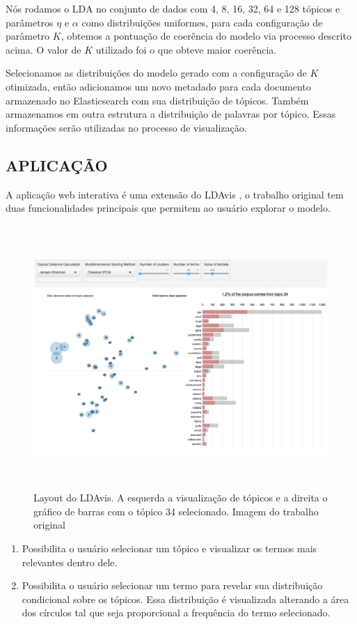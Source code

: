 \documentclass[12pt,a4paper]{article}
\begin{document}
  Nós rodamos o LDA no conjunto de dados com 4, 8, 16, 32, 64 e 128 tópicos e parâmetros $\eta$ e $\alpha$ como distribuições uniformes, para cada configuração de parâmetro $K$,
   obtemos a pontuação de coerência do modelo via processo descrito acima. O valor de $K$ utilizado foi o que obteve maior coerência.
  
  Selecionamos as distribuições do modelo gerado com a configuração de $K$ otimizada, então adicionamos um novo metadado para cada documento armazenado no Elasticsearch com sua distribuição de tópicos.
   Também armazenamos em outra estrutura a distribuição de palavras por tópico. Essas informações serão utilizadas no processo de visualização.
  
  \subsection{APLICAÇÃO}
  A aplicação web interativa é uma extensão do LDAvis \cite{sievert2014ldavis}, o trabalho original tem duas funcionalidades principais
  que permitem ao usuário explorar o modelo.
  
  \begin{figure}[H]
    \centering
      \includegraphics[height=10cm]{images/figure_4.png}
      \caption{Layout do LDAvis. A esquerda a visualização de tópicos e a direita o gráfico de barras com o tópico 34 selecionado. Imagem do trabalho original \cite{sievert2014ldavis}}
  \end{figure}
  
  
  \begin{enumerate}
    \item Possibilita o usuário selecionar um tópico e visualizar os termos mais relevantes dentro dele.
    \item Possibilita o usuário selecionar um termo para revelar sua distribuição condicional sobre os tópicos. Essa distribuição
    é visualizada alterando a área dos círculos tal que seja proporcional a frequência do termo selecionado.
  \end{enumerate}
  
\end{document}
